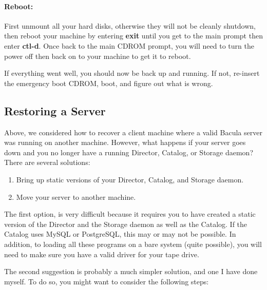 \paragraph*{Reboot:}

First unmount all your hard disks, otherwise they will not be cleanly
shutdown, then reboot your machine by entering {\bf exit} until you get to the
main prompt then enter {\bf ctl-d}. Once back to the main CDROM prompt, you
will need to turn the power off then back on to your machine to get it to
reboot. 

If everything went well, you should now be back up and running. If not,
re-insert the emergency boot CDROM, boot, and figure out what is wrong. 
\label{server}

\subsection*{Restoring a Server}

Above, we considered how to recover a client machine where a valid Bacula
server was running on another machine. However, what happens if your server
goes down and you no longer have a running Director, Catalog, or Storage
daemon? There are several solutions: 

\begin{enumerate}
\item Bring up static versions of your Director, Catalog, and Storage  daemon.

\item Move your server to another machine. 
   \end{enumerate}

The first option, is very difficult because it requires you to have created a
static version of the Director and the Storage daemon as well as the Catalog.
If the Catalog uses MySQL or PostgreSQL, this may or may not be possible. In
addition, to loading all these programs on a bare system (quite possible), you
will need to make sure you have a valid driver for your tape drive. 

The second suggestion is probably a much simpler solution, and one I have done
myself. To do so, you might want to consider the following steps: 

